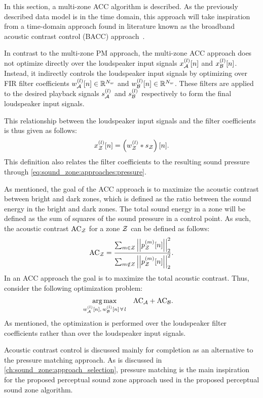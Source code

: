 In this section, a multi-zone ACC algorithm is described.
As the previously described data model is in the time domain, 
this approach will take inspiration from a time-domain approach found in literature known as the
broadband acoustic contrast control (BACC) approach~\cite{elliott2011regularisation, cai2014time, moller2016sound}.

In contrast to the multi-zone PM approach, the multi-zone ACC approach does not optimize directly over 
the loudspeaker input signals $x_{\mathcal{A}}^{(l)}[n]$ and $x_{\mathcal{B}}^{(l)}[n]$.
Instead, it indirectly controls the loudspeaker input signals by optimizing over 
FIR filter coefficients $w_{\mathcal{A}}^{(l)}[n]\in\mathbb{R}^{N_w}$ and $w_{\mathcal{B}}^{(l)}[n]\in\mathbb{R}^{N_w}$.
These filters are applied to the desired playback signals $s_{\mathcal{A}}^{(l)}$ and $s_{\mathcal{B}}^{(l)}$ 
respectively to form the final loudspeaker input signals.

This relationship between the loudspeaker input signals and the filter coefficients is thus given as follows:
\begin{equation}
    x_{\mathcal{Z}}^{(l)}[n] = \left(w_{\mathcal{Z}}^{(l)} \ast s_{\mathcal{Z}}\right)[n].
\end{equation}
This definition also relates the filter coefficients to the resulting sound pressure 
through \autoref{eq:sound_zone:approaches:pressure}.

As mentioned, the goal of the ACC approach is to maximize the acoustic contrast between bright and dark zones,
which is defined as the ratio between the sound energy in the bright and dark zones.
The total sound energy in a zone will be defined as the sum of squares of the sound pressure in a control point.
As such, the acoustic contrast $\text{AC}_{\mathcal{Z}}$ for a zone $\mathcal{Z}$ can be defined as follows: 
\begin{equation}
    \text{AC}_{\zz} = \frac{\sum_{m\in Z} \norm[2][2]{p_\zz^{(m)}[n]}}{\sum_{m\notin Z} \norm[2][2]{p_\zz^{(m)}[n]}}.
\end{equation}
In an ACC approach the goal is to maximize the total acoustic contrast.
Thus, consider the following optimization problem:
\begin{align}
    \operatorname*{arg\,max}_{w_{\mathcal{A}}^{(l)}[n],\,w_{\mathcal{B}}^{(l)}[n]\,\forall\,l}\quad 
       &\text{AC}_{\mathcal{A}} + \text{AC}_{\mathcal{B}}
   .
\end{align}
As mentioned, the optimization is performed over the loudspeaker filter coefficients rather than over the loudspeaker input signals.

Acoustic contrast control is discussed mainly for completion as an alternative to the pressure matching approach.
As is discussed in \autoref{ch:sound_zone:approach_selection}, 
pressure matching is the main inspiration for the proposed perceptual sound zone approach 
used in the proposed perceptual sound zone algorithm.
